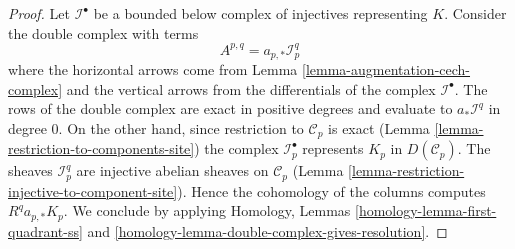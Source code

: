 \documentclass{stacks-project}
\theoremstyle{plain}
\theoremstyle{definition}
\theoremstyle{remark}
\numberwithin{equation}{subsection}
\begin{document}
\begin{proof}
Let $\mathcal{I}^\bullet$ be a bounded below complex of injectives
representing $K$. Consider the double complex with terms
$$
A^{p, q} = a_{p, *}\mathcal{I}^q_p
$$
where the horizontal arrows come from
Lemma \ref{lemma-augmentation-cech-complex}
and the vertical arrows from the differentials of the
complex $\mathcal{I}^\bullet$. The rows of the double complex are exact
in positive degrees and evaluate to $a_*\mathcal{I}^q$ in degree $0$.
On the other hand, since restriction to $\mathcal{C}_p$ is exact
(Lemma \ref{lemma-restriction-to-components-site})
the complex $\mathcal{I}_p^\bullet$ represents $K_p$ in
$D(\mathcal{C}_p)$. The sheaves $\mathcal{I}_p^q$ are injective
abelian sheaves on $\mathcal{C}_p$
(Lemma \ref{lemma-restriction-injective-to-component-site}).
Hence the cohomology of the columns computes $R^qa_{p, *}K_p$.
We conclude by applying
Homology, Lemmas \ref{homology-lemma-first-quadrant-ss} and
\ref{homology-lemma-double-complex-gives-resolution}.
\end{proof}
\end{document}
